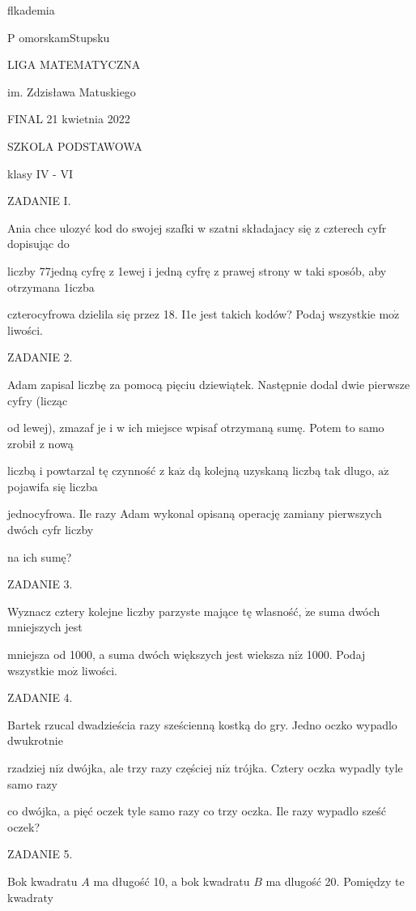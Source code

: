 \documentclass[a4paper,12pt]{article}
\begin{document}
flkademia

P omorskamStupsku

LIGA MATEMATYCZNA

im. Zdzisława Matuskiego

FINAL 21 kwietnia 2022

SZKOLA PODSTAWOWA

klasy IV - VI

ZADANIE I.

Ania chce ulozyć kod do swojej szafki w szatni składajacy się z czterech cyfr dopisując do

liczby 77jedną cyfrę z 1ewej i jedną cyfrę z prawej strony w taki sposób, aby otrzymana 1iczba

czterocyfrowa dzielila się przez 18. I1e jest takich kodów? Podaj wszystkie $\mathrm{m}\mathrm{o}\dot{\mathrm{z}}$ liwości.

ZADANIE 2.

Adam zapisal liczbę za pomocą pięciu dziewiątek. Następnie dodal dwie pierwsze cyfry (licząc

od lewej), zmazaf je i w ich miejsce wpisaf otrzymaną sumę. Potem to samo zrobił z nową

liczbą i powtarzal tę czynność z $\mathrm{k}\mathrm{a}\dot{\mathrm{z}}$ dą kolejną uzyskaną liczbą tak dlugo, $\mathrm{a}\dot{\mathrm{z}}$ pojawifa się liczba

jednocyfrowa. Ile razy Adam wykonal opisaną operację zamiany pierwszych dwóch cyfr liczby

na ich sumę?

ZADANIE 3.

Wyznacz cztery kolejne liczby parzyste mające tę wlasność, $\dot{\mathrm{z}}\mathrm{e}$ suma dwóch mniejszych jest

mniejsza od 1000, a suma dwóch większych jest wieksza $\mathrm{n}\mathrm{i}\dot{\mathrm{z}}$ 1000. Podaj wszystkie $\mathrm{m}\mathrm{o}\dot{\mathrm{z}}$ liwości.

ZADANIE 4.

Bartek rzucal dwadzieścia razy sześcienną kostką do gry. Jedno oczko wypadlo dwukrotnie

rzadziej $\mathrm{n}\mathrm{i}\dot{\mathrm{z}}$ dwójka, ale trzy razy częściej $\mathrm{n}\mathrm{i}\dot{\mathrm{z}}$ trójka. Cztery oczka wypadly tyle samo razy

co dwójka, a pięć oczek tyle samo razy co trzy oczka. Ile razy wypadlo sześć oczek?

ZADANIE 5.

Bok kwadratu $A$ ma długość 10, a bok kwadratu $B$ ma dlugość 20. Pomiędzy te kwadraty
\end{document}
